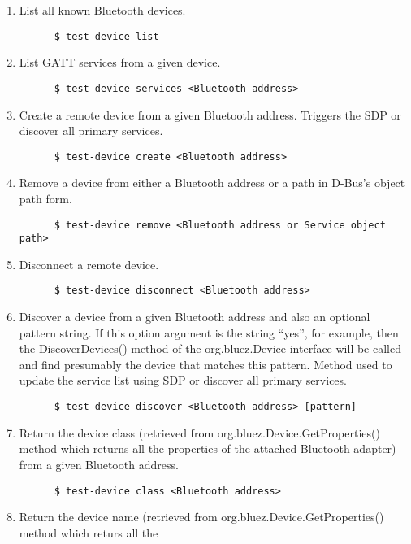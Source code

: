 \documentclass[11pt]{article}
\begin{document}
\begin{enumerate}
  \item List all known Bluetooth devices.
    \begin{verbatim}
      $ test-device list
    \end{verbatim}
  \item List GATT services from a given device.
    \begin{verbatim}
      $ test-device services <Bluetooth address>
    \end{verbatim}
  \item Create a remote device from a given Bluetooth address. Triggers the
	  SDP or discover all primary services.
    \begin{verbatim}
      $ test-device create <Bluetooth address>
    \end{verbatim}
  \item Remove a device from either a Bluetooth address or a path in
        D-Bus's object path form.
    \begin{verbatim}
      $ test-device remove <Bluetooth address or Service object path>
    \end{verbatim}
  \item Disconnect a remote device.
    \begin{verbatim}
      $ test-device disconnect <Bluetooth address>
    \end{verbatim}
  \item Discover a device from a given Bluetooth address and also an
        optional pattern string. If this option argument is the string
        ``yes'', for example, then the DiscoverDevices() method of the
        org.bluez.Device interface will be called and find presumably
        the device that matches this pattern. Method used to update the
	service list using SDP or discover all primary services.
    \begin{verbatim}
      $ test-device discover <Bluetooth address> [pattern]
    \end{verbatim}
  \item Return the device class (retrieved from
        org.bluez.Device.GetProperties() method which returns all the
        properties of the attached Bluetooth adapter) from a given
        Bluetooth address.
    \begin{verbatim}
      $ test-device class <Bluetooth address>
    \end{verbatim}
  \item Return the device name (retrieved from
        org.bluez.Device.GetProperties() method which returs all the

\end{enumerate}
\end{document}
